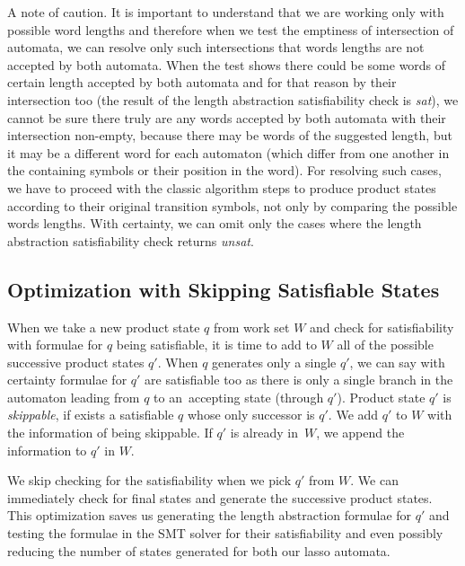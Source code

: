 A note of caution. It is important to understand that we are working only with possible word lengths and therefore when we test the emptiness of intersection of automata, we can resolve only such intersections that words lengths are not accepted by both automata. When the test shows there could be some words of certain length accepted by both automata and for that reason by their intersection too (the result of the length abstraction satisfiability check is \emph{sat}), we cannot be sure there truly are any words accepted by both automata with their intersection non-empty, because there may be words of the suggested length, but it may be a different word for each automaton (which differ from one another in the containing symbols or their position in the word). For resolving such cases, we have to proceed with the classic algorithm steps to produce product states according to their original transition symbols, not only by comparing the possible words lengths. With certainty, we can omit only the cases where the length abstraction satisfiability check returns \emph{unsat}.


\subsection{Optimization with Skipping Satisfiable States} \label{sec:skipping states}

When we take a new product state $q$ from work set $W$ and check for satisfiability with formulae for $q$ being satisfiable, it is time to add to $W$ all of the possible successive product states $q'$. When $q$ generates only a single $q'$, we can say with certainty formulae for $q'$ are satisfiable too as there is only a single branch in the automaton leading from $q$ to an~accepting state (through $q'$). Product state $q'$ is \emph{skippable}, if exists a satisfiable $q$ whose only successor is $q'$. We add $q'$ to $W$ with the information of being skippable. If $q'$ is already in~$W$, we append the information to $q'$ in $W$.

We skip checking for the satisfiability when we pick $q'$ from $W$. We can immediately check for final states and generate the successive product states. This optimization saves us generating the length abstraction formulae for $q'$ and testing the formulae in the SMT solver for their satisfiability and even possibly reducing the number of states generated for both our lasso automata.

